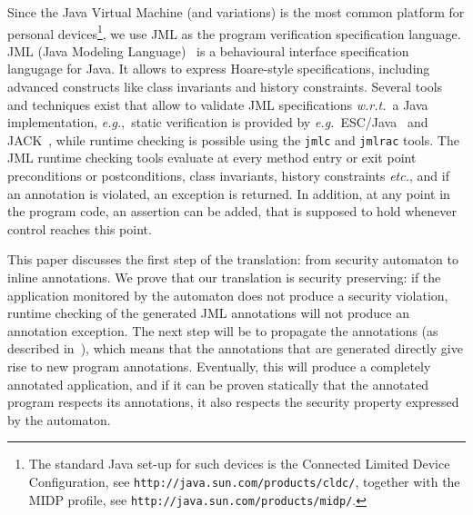Since the Java Virtual Machine (and variations) is the most common
platform for personal devices\footnote{The standard Java set-up for
such devices is the Connected Limited Device Configuration, see
\texttt{http://java.sun.com/products/cldc/}, together with the MIDP
profile, see \texttt{http://java.sun.com/products/midp/}.}, we use JML
as the program verification specification language.  JML (Java
Modeling Language)~\cite{LeavensPCCRCK05} is a behavioural interface
specification langugage for Java. It allows to express Hoare-style
specifications, including advanced constructs like class invariants
and history constraints. Several tools and techniques exist that allow
to validate JML specifications \emph{w.r.t.}\ a Java implementation,
\emph{e.g.},\ static verification is provided by 
\emph{e.g.}\ ESC/Java~\cite{CokK04} and
JACK~\cite{BartheBCGHMPPSV06}, while runtime checking is possible
using the \texttt{jmlc} and \texttt{jmlrac} tools. The JML runtime
checking tools evaluate at every method entry or exit point
preconditions or postconditions, class invariants, history constraints
\emph{etc.}, and if an annotation is violated, an exception is
returned. In addition, at any point in the program code, an assertion
can be added, that is supposed to hold whenever control reaches this
point.

This paper discusses the first step of the translation: from security
automaton to inline annotations. We prove that our translation is
security preserving: if the application monitored by the automaton
does not produce a security violation, runtime checking of the
generated JML annotations will not produce an annotation
exception. The next step will be to propagate the annotations (as
described in~\cite{PavlovaBBHL04}), which means that the annotations
that are generated directly give rise to new program
annotations. Eventually, this will produce a completely annotated
application, and if it can be proven statically that the annotated
program respects its annotations, it also respects the security
property expressed by the automaton.  

